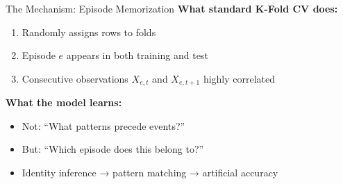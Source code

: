 \documentclass[aspectratio=169]{beamer}
\begin{document}
\begin{frame}{The Mechanism: Episode Memorization}
\textbf{What standard K-Fold CV does:}
\begin{enumerate}
\item Randomly assigns \alert{rows} to folds
\item Episode $e$ appears in \alert{both} training and test
\item Consecutive observations $X_{e,t}$ and $X_{e,t+1}$ highly correlated
\end{enumerate}

\vspace{1em}
\textbf{What the model learns:}
\begin{itemize}
\item Not: ``What patterns precede events?''
\item But: \alert{``Which episode does this belong to?''}
\item Identity inference → pattern matching → artificial accuracy
\end{itemize}

\vspace{1em}
\begin{center}
\end{center}
\end{frame}
\end{document}
